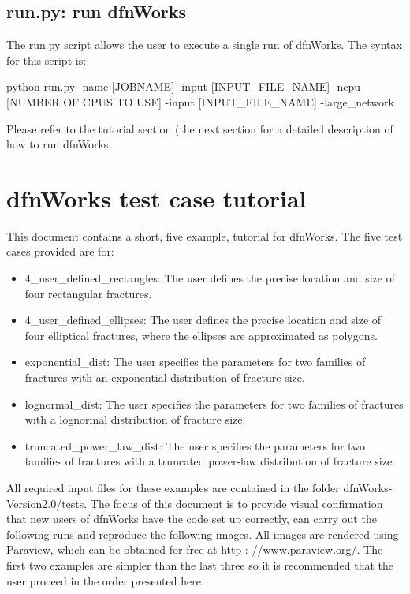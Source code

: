 \documentclass[letterpaper,10pt,english]{sphinxmanual}
\begin{document}
\section{run.py: run dfnWorks}
\label{scripts:run-py-run-dfnworks}
The run.py script allows the user to execute a single run of dfnWorks. The syntax for this script is:

python run.py -name {[}JOBNAME{]} -input {[}INPUT\_FILE\_NAME{]} -ncpu {[}NUMBER OF CPUS TO USE{]} -input {[}INPUT\_FILE\_NAME{]} -large\_network

Please refer to the tutorial section (the next section for a detailed description of how to run dfnWorks.


\chapter{dfnWorks test case tutorial}
\label{examples:dfnworks-test-case-tutorial}\label{examples::doc}
This document contains a short, five example, tutorial for dfnWorks. The five test cases provided are for:
\begin{itemize}
\item {} 
4\_user\_defined\_rectangles: The user defines the precise location and size of four rectangular fractures.

\item {} 
4\_user\_defined\_ellipses: The user defines the precise location and size of four elliptical fractures, where the ellipses are approximated as polygons.

\item {} 
exponential\_dist: The user specifies the parameters for two families of fractures with an exponential distribution of fracture size.

\item {} 
lognormal\_dist: The user specifies the parameters for two families of fractures with a lognormal distribution of fracture size.

\item {} 
truncated\_power\_law\_dist: The user specifies the parameters for two families of fractures with a truncated power-law distribution of fracture size.

\end{itemize}

All required input files for these examples are contained in the folder dfnWorks-Version2.0/tests. The focus of this document is to provide visual confirmation that new users of dfnWorks have the code set up correctly, can carry out the following runs and reproduce the following images. All images are rendered using Paraview, which can be obtained for free at http : //www.paraview.org/. The first two examples are simpler than the last three so it is recommended that the user proceed in the order presented here.
\end{document}
